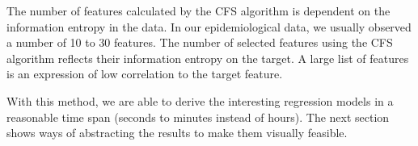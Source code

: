 \documentclass[journal]{style/vgtc} 			          %
\begin{document}
The number of features calculated by the CFS algorithm is dependent on the information entropy in the data.
In our epidemiological data, we usually observed a number of 10 to 30 features.
The number of selected features using the CFS algorithm reflects their information entropy on the target.
A large list of features is an expression of low correlation to the target feature.

With this method, we are able to derive the interesting regression models in a reasonable time span (seconds to minutes instead of hours).
The next section shows ways of abstracting the results to make them visually feasible.

\end{document}
